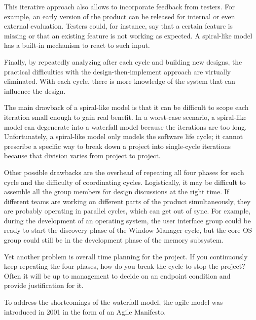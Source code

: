 This iterative approach also allows to incorporate feedback from testers. For example, an early version of the product can be released for internal or even external evaluation. Testers could, for instance, say that a certain feature is missing or that an existing feature is not working as expected. A spiral-like model has a built-in mechanism to react to such input.

Finally, by repeatedly analyzing after each cycle and building new designs, the practical difficulties with the design-then-implement approach are virtually eliminated. With each cycle, there is more knowledge of the system that can influence the design.


The main drawback of a spiral-like model is that it can be difficult to scope each iteration small enough to gain real benefit. In a worst-case scenario, a spiral-like model can degenerate into a waterfall model because the iterations are too long. Unfortunately, a spiral-like model only models the software life cycle; it cannot prescribe a specific way to break down a project into single-cycle iterations because that division varies from project to project.

Other possible drawbacks are the overhead of repeating all four phases for each cycle and the difficulty of coordinating cycles. Logistically, it may be difficult to assemble all the group members for design discussions at the right time. If different teams are working on different parts of the product simultaneously, they are probably operating in parallel cycles, which can get out of sync. For example, during the development of an operating system, the user interface group could be ready to start the discovery phase of the Window Manager cycle, but the core OS group could still be in the development phase of the memory subsystem.

Yet another problem is overall time planning for the project. If you continuously keep repeating the four phases, how do you break the cycle to stop the project? Often it will be up to management to decide on an endpoint condition and provide justification for it.


To address the shortcomings of the waterfall model, the agile model was introduced in 2001 in the form of an Agile Manifesto.

